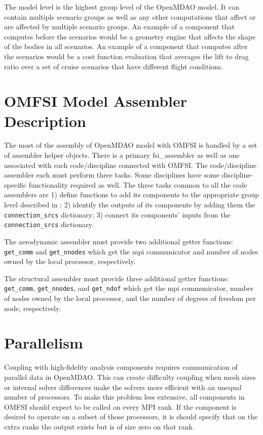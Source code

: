 \documentclass{article}
\begin{document}
The model level is the highest group level of the OpenMDAO model.
It can contain multiple scenario groups as well as any other computations that affect or are affected by multiple scenario groups.
An example of a component that computes before the scenarios would be a geometry engine that affects the shape of the bodies in all scenarios.
An example of a component that computes after the scenarios would be a cost function evaluation that averages the lift to drag ratio over a set of cruise scenarios that have different flight conditions.

\section{OMFSI Model Assembler Description}
The most of the assembly of OpenMDAO model with OMFSI is handled by a set of assembler helper objects.
There is a primary fsi\_assembler as well as one associated with each code/discipline connected with OMFSI.
The code/discipline assembler each must perform three tasks.
Some disciplines have some discipline-specific functionality required as well.
The three tasks common to all the code assemblers are
1) define functions to add its components to the appropriate group level described in ;
2) identify the outputs of its components by adding them the {\tt connection\_srcs} dictionary;
3) connect its components' inputs from the {\tt connection\_srcs} dictionary.

The aerodynamic assembler must provide two additional getter functions: {\tt get\_comm} and {\tt get\_nnodes} which get the mpi communicator and number of nodes owned by the local processor, respectively.

The structural assembler must provide three additional getter functions: {\tt get\_comm}, {\tt get\_nnodes}, and {\tt get\_ndof} which get the mpi communicator, number of nodes owned by the local processor, and the number of degrees of freedom per node, respectively.
\section{Parallelism}
Coupling with high-fidelity analysis components requires communication of parallel data in OpenMDAO.
This can create difficulty coupling when mesh sizes or internal solver differences make the solvers more efficient with an unequal number of processors.
To make this problem less extensive, all components in OMFSI should expect to be called on every MPI rank.
If the component is desired to operate on a subset of those processors, it is should specify that on the extra ranks the output exists but is of size zero on that rank.
\end{document}
